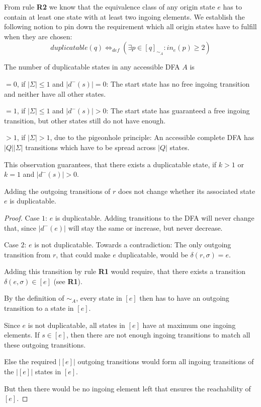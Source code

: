 From rule \textbf{R2} we know that the equivalence class of any origin state $e$ has to contain at least one state with at least two ingoing elements. We establish the following notion to pin down the requirement which all origin states have to fulfill when they are chosen:
\[
duplicatable(q) \Leftrightarrow_{def} (\exists p \in [q]_{\sim_A}\colon in_e(p)\ge 2)
\]
\begin{observation}
	The number of duplicatable states in any accessible DFA $A$ is
	\begin{description}
		\item$= 0$, if $|\Sigma| \leq 1$ and $|d^-(s)| = 0$: The start state has no free ingoing transition and neither have all other states.
		
		\item$= 1$, if $|\Sigma| \leq 1$ and $|d^-(s)| > 0$: The start state has guaranteed a free ingoing transition, but other states still do not have enough.
		
		\item$> 1$, if $|\Sigma| > 1$, due to the pigeonhole principle: An accessible complete DFA has $|Q||\Sigma|$ transitions which have to be spread across $|Q|$ states.
	\end{description}
\end{observation}
\noindent This observation guarantees, that there exists a duplicatable state, if $k > 1$ or $k = 1$ and $|d^-(s)| > 0$.
\begin{lemma}
	Adding the outgoing transitions of $r$ does not change whether its associated state $e$ is duplicatable.
\end{lemma}
\begin{proof}
Case $1$: $e$ is duplicatable. Adding transitions to the DFA will never change that, since $|d^-(e)|$ will stay the same or increase, but never decrease.\par
	
Case $2$: $e$ is not duplicatable. Towards a contradiction: The only outgoing transition from $r$, that could make $e$ duplicatable, would be $\delta(r, \sigma) = e$.
	
Adding this transition by rule \textbf{R1} would require, that there exists a transition $\delta(e, \sigma) \in [e]$ (see \textbf{R1}).
	
By the definition of $\sim_A$, every state in $[e]$ then has to have an outgoing transition to a state in $[e]$.
	
Since $e$ is not duplicatable, all states in $[e]$ have at maximum one ingoing elements. If $s \in [e]$, then there are not enough ingoing transitions to match all these outgoing transitions.

Else the required $|[e]|$ outgoing transitions would form all ingoing transitions of the $|[e]|$ states in $[e]$.
	
But then there would be no ingoing element left that ensures the reachability of $[e]$.
\end{proof}

